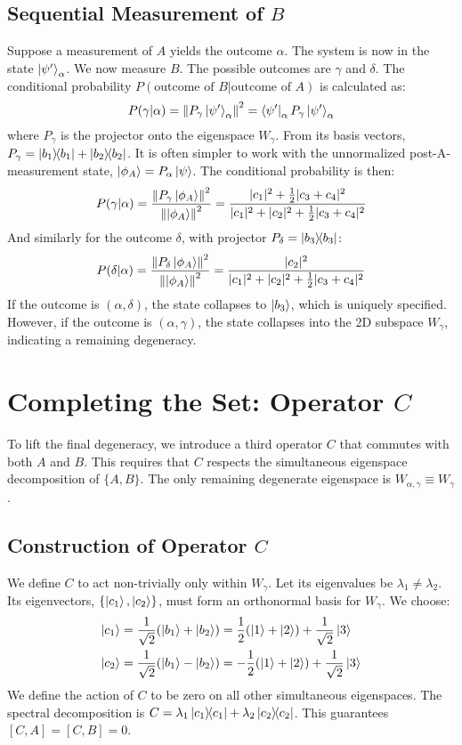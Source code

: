 \documentclass[11pt,a4paper]{article}
\begin{document}
\subsection{Sequential Measurement of \texorpdfstring{$B$}{B}}
Suppose a measurement of $A$ yields the outcome $\alpha$. The system is now in the state $\ket{\psi'}_\alpha$. We now measure $B$. The possible outcomes are $\gamma$ and $\delta$. The conditional probability $P(\text{outcome of } B | \text{outcome of } A)$ is calculated as:
$$
P(\gamma|\alpha) = \norm{P_\gamma \ket{\psi'}_\alpha}^2 = \bra{\psi'}_\alpha P_\gamma \ket{\psi'}_\alpha
$$
where $P_\gamma$ is the projector onto the eigenspace $W_\gamma$. From its basis vectors, $P_\gamma = \dyad{b_1}{b_1} + \dyad{b_2}{b_2}$.
It is often simpler to work with the unnormalized post-A-measurement state, $\ket{\phi_A} = P_\alpha\ket{\psi}$. The conditional probability is then:
$$
P(\gamma|\alpha) = \frac{\norm{P_\gamma \ket{\phi_A}}^2}{\norm{\ket{\phi_A}}^2} = \frac{|c_1|^2 + \frac{1}{2}|c_3+c_4|^2}{|c_1|^2 + |c_2|^2 + \frac{1}{2}|c_3+c_4|^2}
$$
And similarly for the outcome $\delta$, with projector $P_\delta = \dyad{b_3}{b_3}$:
$$
P(\delta|\alpha) = \frac{\norm{P_\delta \ket{\phi_A}}^2}{\norm{\ket{\phi_A}}^2} = \frac{|c_2|^2}{|c_1|^2 + |c_2|^2 + \frac{1}{2}|c_3+c_4|^2}
$$
If the outcome is $(\alpha, \delta)$, the state collapses to $\ket{b_3}$, which is uniquely specified. However, if the outcome is $(\alpha, \gamma)$, the state collapses into the 2D subspace $W_\gamma$, indicating a remaining degeneracy.

\section{Completing the Set: Operator \texorpdfstring{$C$}{C}}
To lift the final degeneracy, we introduce a third operator $C$ that commutes with both $A$ and $B$. This requires that $C$ respects the simultaneous eigenspace decomposition of $\{A,B\}$. The only remaining degenerate eigenspace is $W_{\alpha,\gamma} \equiv W_\gamma$.

\subsection{Construction of Operator \texorpdfstring{$C$}{C}}
We define $C$ to act non-trivially only within $W_\gamma$. Let its eigenvalues be $\lambda_1 \neq \lambda_2$. Its eigenvectors, $\{\ket{c_1}, \ket{c_2}\}$, must form an orthonormal basis for $W_\gamma$. We choose:
\begin{align*}
    \ket{c_1} &= \frac{1}{\sqrt{2}}(\ket{b_1} + \ket{b_2}) = \frac{1}{2}(\ket{1}+\ket{2}) + \frac{1}{\sqrt{2}}\ket{3} \\
    \ket{c_2} &= \frac{1}{\sqrt{2}}(\ket{b_1} - \ket{b_2}) = -\frac{1}{2}(\ket{1}+\ket{2}) + \frac{1}{\sqrt{2}}\ket{3}
\end{align*}
We define the action of $C$ to be zero on all other simultaneous eigenspaces. The spectral decomposition is $C = \lambda_1 \dyad{c_1}{c_1} + \lambda_2 \dyad{c_2}{c_2}$. This guarantees $[C,A]=[C,B]=0$.
\end{document}
